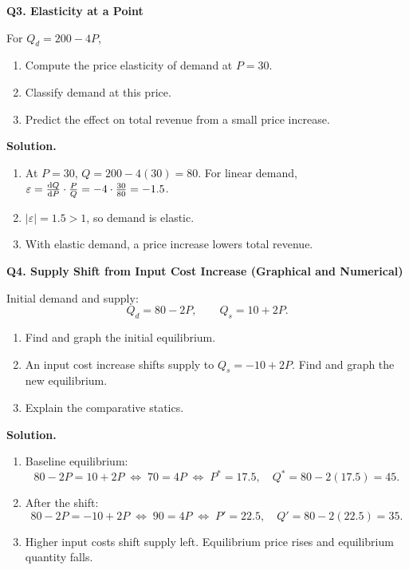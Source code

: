 \documentclass[11pt]{article}
\newcommand{\eq}{\Leftrightarrow}
\begin{document}
\bigskip

\noindent \textbf{Q3. Elasticity at a Point}

For \(Q_d=200-4P\),
\begin{enumerate}[label=(\alph*)]
\item Compute the price elasticity of demand at \(P=30\).
\item Classify demand at this price.
\item Predict the effect on total revenue from a small price increase.
\end{enumerate}

\textbf{Solution.}
\begin{enumerate}[label=(\alph*)]
\item At \(P=30\), \(Q=200-4(30)=80\). For linear demand, \(\varepsilon=\dv{Q}{P}\cdot \frac{P}{Q}=-4\cdot \frac{30}{80}=-1.5\).
\item \(|\varepsilon|=1.5>1\), so demand is elastic.
\item With elastic demand, a price increase lowers total revenue.
\end{enumerate}

\bigskip

\noindent \textbf{Q4. Supply Shift from Input Cost Increase (Graphical and Numerical)}

Initial demand and supply:
\[
Q_d=80-2P,\qquad Q_s=10+2P.
\]
\begin{enumerate}[label=(\alph*))]
\item Find and graph the initial equilibrium.
\item An input cost increase shifts supply to \(Q_s=-10+2P\). Find and graph the new equilibrium.
\item Explain the comparative statics.
\end{enumerate}

\textbf{Solution.}
\begin{enumerate}[label=(\alph*)]
\item Baseline equilibrium:
\[
80-2P=10+2P \;\eq\; 70=4P \;\eq\; P^\ast=17.5,\quad Q^\ast=80-2(17.5)=45.
\]
\item After the shift:
\[
80-2P=-10+2P \;\eq\; 90=4P \;\eq\; P' = 22.5,\quad Q' = 80-2(22.5)=35.
\]
\item Higher input costs shift supply left. Equilibrium price rises and equilibrium quantity falls.
\end{enumerate}
\end{document}
